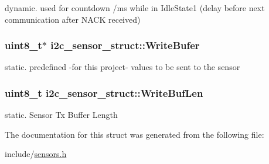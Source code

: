 dynamic. used for countdown /ms while in Idle\-State1 (delay before next communication after N\-A\-C\-K received) \hypertarget{structi2c__sensor__struct_afb7749c548cfe113c165dc3aa3404201}{
\subsubsection[{Write\-Bufer}]{\setlength{\rightskip}{0pt plus 5cm}uint8\-\_\-t$\ast$ i2c\-\_\-sensor\-\_\-struct\-::\-Write\-Bufer}}\label{structi2c__sensor__struct_afb7749c548cfe113c165dc3aa3404201}
static. predefined -\/for this project-\/ values to be sent to the sensor \hypertarget{structi2c__sensor__struct_a56a27f2bbd19d6404911424510854ab4}{
\subsubsection[{Write\-Buf\-Len}]{\setlength{\rightskip}{0pt plus 5cm}uint8\-\_\-t i2c\-\_\-sensor\-\_\-struct\-::\-Write\-Buf\-Len}}\label{structi2c__sensor__struct_a56a27f2bbd19d6404911424510854ab4}
static. Sensor Tx Buffer Length 

The documentation for this struct was generated from the following file\-:\begin{DoxyCompactItemize}
\item 
include/\hyperlink{sensors_8h}{sensors.\-h}\end{DoxyCompactItemize}
